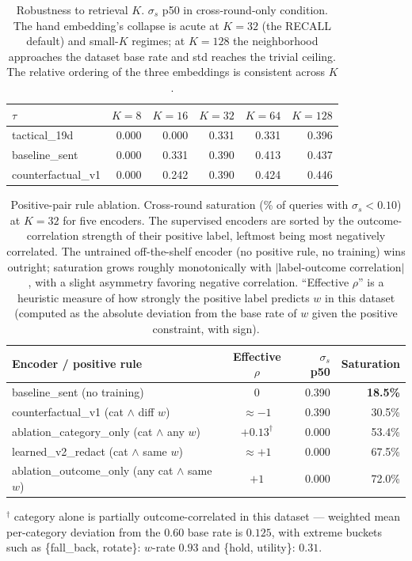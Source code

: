 \documentclass{article}
\begin{document}
\begin{table}[t]
\centering
\caption{Robustness to retrieval $K$. $\sigma_s$ p50 in cross-round-only condition. The hand embedding's collapse is acute at $K{=}32$ (the RECALL default) and small-$K$ regimes; at $K{=}128$ the neighborhood approaches the dataset base rate and std reaches the trivial ceiling. The relative ordering of the three embeddings is consistent across $K$.}
\label{tab:k_sweep}
\small
\begin{tabular}{lrrrrr}
\toprule
\textbf{$\tau$} & $K{=}8$ & $K{=}16$ & $K{=}32$ & $K{=}64$ & $K{=}128$ \\
\midrule
tactical\_19d         & 0.000 & 0.000 & 0.331 & 0.331 & 0.396 \\
baseline\_sent        & 0.000 & 0.331 & 0.390 & 0.413 & 0.437 \\
counterfactual\_v1    & 0.000 & 0.242 & 0.390 & 0.424 & 0.446 \\
\bottomrule
\end{tabular}
\end{table}

\begin{table}[t]
\centering
\caption{Positive-pair rule ablation. Cross-round saturation (\% of queries with $\sigma_s < 0.10$) at $K{=}32$ for five encoders. The supervised encoders are sorted by the outcome-correlation strength of their positive label, leftmost being most negatively correlated. The untrained off-the-shelf encoder (no positive rule, no training) wins outright; saturation grows roughly monotonically with $|$label-outcome correlation$|$, with a slight asymmetry favoring negative correlation. ``Effective $\rho$'' is a heuristic measure of how strongly the positive label predicts $w$ in this dataset (computed as the absolute deviation from the base rate of $w$ given the positive constraint, with sign).}
\label{tab:positive_rule_ablation}
\small
\begin{tabular}{lcrr}
\toprule
\textbf{Encoder / positive rule} & \textbf{Effective $\rho$} & \textbf{$\sigma_s$ p50} & \textbf{Saturation} \\
\midrule
baseline\_sent (no training)             & $0$    & 0.390 & \textbf{18.5\%} \\
counterfactual\_v1 (cat $\wedge$ diff $w$) & $\approx -1$ & 0.390 & 30.5\% \\
ablation\_category\_only (cat $\wedge$ any $w$) & $+0.13^\dagger$ & 0.000 & 53.4\% \\
learned\_v2\_redact (cat $\wedge$ same $w$)     & $\approx +1$ & 0.000 & 67.5\% \\
ablation\_outcome\_only (any cat $\wedge$ same $w$) & $+1$         & 0.000 & 72.0\% \\
\bottomrule
\end{tabular}

\vspace{0.4em}
\small
$^\dagger$ category alone is partially outcome-correlated in this dataset --- weighted mean per-category deviation from the 0.60 base rate is $0.125$, with extreme buckets such as \{fall\_back, rotate\}: $w$-rate $0.93$ and \{hold, utility\}: $0.31$.
\end{table}
\end{document}

